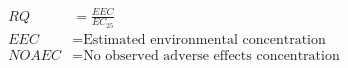 \documentclass[fleqn, oneside, 11pt]{article}%
\begin{document}
\begin{preview}
\begin{align*}%
RQ & =  \frac{EEC}{EC_{25}}\nonumber \\
EEC & =  \text{Estimated environmental concentration} \nonumber \\
NOAEC & =  \text{No observed adverse effects concentration} \nonumber \\
\end{align*} 
\end{preview}
\end{document}
